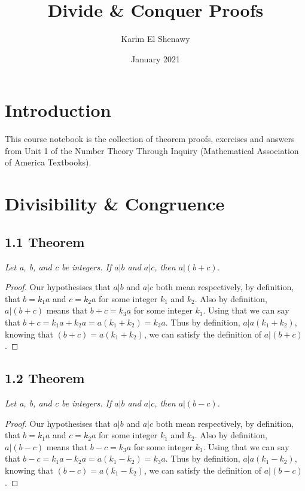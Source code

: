 \documentclass{article}
\title{Divide \& Conquer Proofs}
\author{Karim El Shenawy}
\date{January 2021}
\begin{document}
\maketitle

\section*{Introduction}
This course notebook is the collection of theorem proofs, exercises and answers from Unit 1 of the Number Theory Through Inquiry (Mathematical Association of America Textbooks).

\section*{Divisibility \& Congruence}

\subsection*{1.1 Theorem} 
\quad \textit{Let a, b, and c be integers. If $a \vert b$ and $a \vert c$, then $a \vert (b+c)$.}

\begin{proof}
Our hypothesises that $a \vert b$ and $a \vert c$ both mean respectively, by definition, that $b = k_1a$ and $c = k_2a$ for some integer $k_1$ and $k_2$. Also by definition, $a \vert (b+c)$ means that $b + c = k_3a$ for some integer $k_3$. Using that we can say that $b + c = k_1a + k_2a = a(k_1+k_2) = k_3a$. Thus by definition, $a \vert a(k_1+k_2)$, knowing that $(b+c) = a(k_1+k_2)$, we can satisfy the definition of $a \vert (b+c)$.
\end{proof}

\subsection*{1.2 Theorem} 
\quad \textit{Let a, b, and c be integers. If $a \vert b$ and $a \vert c$, then $a \vert (b-c)$.}

\begin{proof}
Our hypothesises that $a \vert b$ and $a \vert c$ both mean respectively, by definition, that $b = k_1a$ and $c = k_2a$ for some integer $k_1$ and $k_2$. Also by definition, $a \vert (b-c)$ means that $b - c = k_3a$ for some integer $k_3$. Using that we can say that $b - c = k_1a - k_2a = a(k_1 - k_2) = k_3a$. Thus by definition, $a \vert a(k_1 - k_2)$, knowing that $(b - c) = a(k_1 - k_2)$, we can satisfy the definition of $a \vert (b - c)$.
\end{proof}
\end{document}
